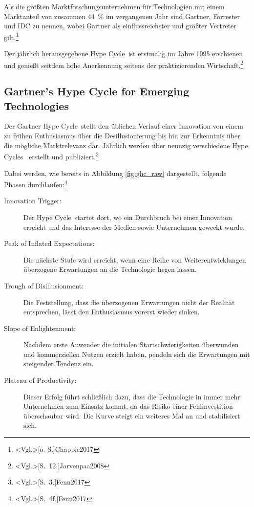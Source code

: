 Als die größten Marktforschungsunternehmen für Technologien mit einem Marktanteil von zusammen 44~\% im vergangenen Jahr sind Gartner, Forrester und IDC zu nennen, wobei Gartner als einflussreichster und größter Vertreter gilt.\footnote{\citeNP<Vgl.>[o. S.]{Chapple2017}}

Der jährlich herausgegebene \glqq Hype Cycle\grqq~ist erstmalig im Jahre 1995 erschienen und genießt seitdem hohe Anerkennung seitens der praktizierenden Wirtschaft.\footnote{\citeNP<Vgl.>[S.~12.]{Jarvenpaa2008}}

\subsection{Gartner’s Hype Cycle for Emerging Technologies}
Der \glqq Gartner Hype Cycle\grqq~stellt den üblichen Verlauf einer Innovation von einem zu frühen Enthusiasmus über die Desillusionierung bis hin zur Erkenntnis über die mögliche Marktrelevanz dar. Jährlich werden über neunzig verschiedene \glqq Hype Cycles\grqq~ erstellt und publiziert.\footnote{\citeNP<Vgl.>[S.~3.]{Fenn2017}}

Dabei werden, wie bereits in Abbildung \ref{fig:ghc_raw} dargestellt, folgende Phasen durchlaufen:\footnote{\citeNP<Vgl.>[S.~4f.]{Fenn2017}}
\begin{description}
	\item[Innovation Trigger:] Der \glqq Hype Cycle\grqq~startet dort, wo ein Durchbruch bei einer Innovation erreicht und das Interesse der Medien sowie Unternehmen geweckt wurde.
	\item[Peak of Inflated Expectations:] Die nächste Stufe wird erreicht, wenn eine Reihe von Weiterentwicklungen überzogene Erwartungen an die Technologie hegen lassen.
	\item[Trough of Disillusionment:] Die Feststellung, dass die überzogenen Erwartungen nicht der Realität entsprechen, lässt den Enthusiasmus vorerst wieder sinken.
	\item[Slope of Enlightenment:] Nachdem erste Anwender die initialen Startschwierigkeiten überwunden und kommerziellen Nutzen erzielt haben, pendeln sich die Erwartungen mit steigender Tendenz ein.
	\item[Plateau of Productivity:] Dieser Erfolg führt schließlich dazu, dass die Technologie in immer mehr Unternehmen zum Einsatz kommt, da das Risiko einer Fehlinvestition überschaubar wird. Die Kurve steigt ein weiteres Mal an und stabilisiert sich.
\end{description}

